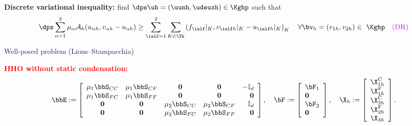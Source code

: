 \begin{frame}
        \textcolor{cadmiumgreen}{\textbf{Discrete variational inequality:}} find $\dps \uh=(\uunh,\udeuxh) \in \Kghp$ such that
\begin{equation*}
\dps \sum_{\alpha=1}^2 \mu_{\alpha} \mathcal{A}_h(u_{\alpha h}, v_{\alpha h} - u_{\alpha h}) \geq \sum_{\ialf=1}^2 \sum_{K \in \Th} \left(f_\ialf|_K,v_{\ialf h}|_K-u_{\ialf h}|_K\right)_{K} \quad \forall \bv_h = (v_{1h},v_{2h})\in ~\Kghp \quad \textcolor{electricpurple}{(\mathrm{DR})}
\end{equation*}
  \begin{center}
\textcolor{midnightblue}{Well-posed problem (Lions--Stampacchia)}
\end{center}
  \textcolor{red}{\textbf{HHO without static condensation:}}
  \begin{align*}
\bbE \egaldef 
\left[
  \begin{array}{ccccr}
    \mu_1 \bbS_{CC} 
    & \mu_1 \bbS_{CF} & \bf 0 & \bf 0 & -\mathbb{I}_d 
    \\
    \mu_1 \bbS_{FC} 
    & \mu_1 \bbS_{FF} & \bf 0 & \bf 0 & \bf 0
    \\
    \bf 0 & \bf 0 & \mu_2 \bbS_{CC} & \mu_2 \bbS_{CF} & \mathbb{I}_d
    \\
    \bf 0 & \bf 0 & \mu_2 \bbS_{FC} & \mu_2 \bbS_{FF} & \bf 0
  \end{array}
\right], \quad 
\bF \egaldef \left[\begin{array}{l} \bF_1 \\ \bf 0 \\ \bF_2 \\ \bf 0 \end{array} \right], \quad
\X_h \egaldef \left[
  \begin{array}{l}\X_{1h}^{\mathrm{C}}\\ \X_{1h}^{\mathrm{F}} \\ \X_{2h}^{\mathrm{C}}\\ \X_{2h}^{\mathrm{F}} \\ \X_{3h} \end{array} \right] .
  \end{align*}
  \vspace*{-0.2 cm}

\end{frame}
